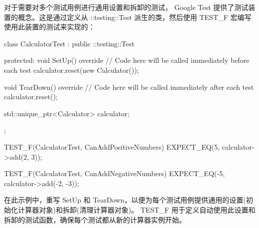 对于需要对多个测试用例进行通用设置和拆卸的测试， Google Test 提供了测试装置的概念。这是通过定义从 ::testing::Test 派生的类，然后使用 TEST\_F 宏编写使用此装置的测试来实现的：

\begin{cpp}
class CalculatorTest : public ::testing::Test {
    protected:
    void SetUp() override {
        // Code here will be called immediately before each test
        calculator.reset(new Calculator());
    }

    void TearDown() override {
        // Code here will be called immediately after each test
        calculator.reset();
    }

    std::unique_ptr<Calculator> calculator;
};

TEST_F(CalculatorTest, CanAddPositiveNumbers) {
    EXPECT_EQ(5, calculator->add(2, 3));
}

TEST_F(CalculatorTest, CanAddNegativeNumbers) {
    EXPECT_EQ(-5, calculator->add(-2, -3));
}
\end{cpp}

在此示例中，重写 SetUp 和 TearDown，以便为每个测试用例提供通用的设置(初始化计算器对象)和拆卸(清理计算器对象)。 TEST\_F 用于定义自动使用此设置和拆卸的测试函数，确保每个测试都从新的计算器实例开始。
























